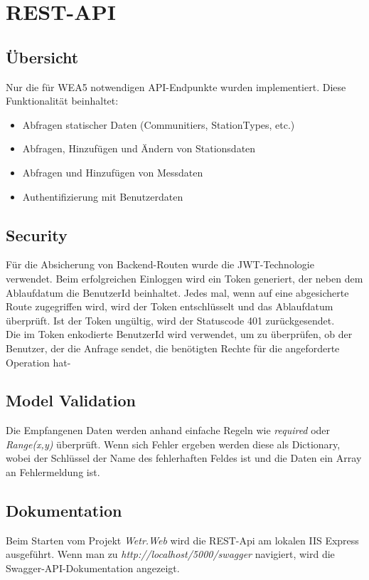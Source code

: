 \section{REST-API}
\label{rest}

\subsection{Übersicht}

Nur die für WEA5 notwendigen API-Endpunkte wurden implementiert. Diese Funktionalität beinhaltet:
\begin{itemize}
    \item Abfragen statischer Daten (Communitiers, StationTypes, etc.)
    \item Abfragen, Hinzufügen und Ändern von Stationsdaten
    \item Abfragen und Hinzufügen von Messdaten
    \item Authentifizierung mit Benutzerdaten
\end{itemize}

\subsection{Security}

Für die Absicherung von Backend-Routen wurde die JWT-Technologie verwendet.
Beim erfolgreichen Einloggen wird ein Token generiert, der neben dem Ablaufdatum die BenutzerId beinhaltet. Jedes mal, wenn auf eine abgesicherte Route zugegriffen wird, wird der Token entschlüsselt und das Ablaufdatum überprüft. Ist der Token ungültig, wird der Statuscode 401 zurückgesendet.\\

Die im Token enkodierte BenutzerId wird verwendet, um zu überprüfen, ob der Benutzer, der die Anfrage sendet, die benötigten Rechte für die angeforderte Operation hat-

\subsection{Model Validation}
Die Empfangenen Daten werden anhand einfache Regeln wie \textit{required} oder \textit{Range(x,y)} überprüft. Wenn sich Fehler ergeben werden diese als Dictionary, wobei der Schlüssel der Name des fehlerhaften Feldes ist und die Daten ein Array an Fehlermeldung ist.

\subsection{Dokumentation}
Beim Starten vom Projekt \textit{Wetr.Web} wird die REST-Api am lokalen IIS Express ausgeführt. Wenn man zu \textit{http://localhost/5000/swagger} navigiert, wird die Swagger-API-Dokumentation angezeigt.

